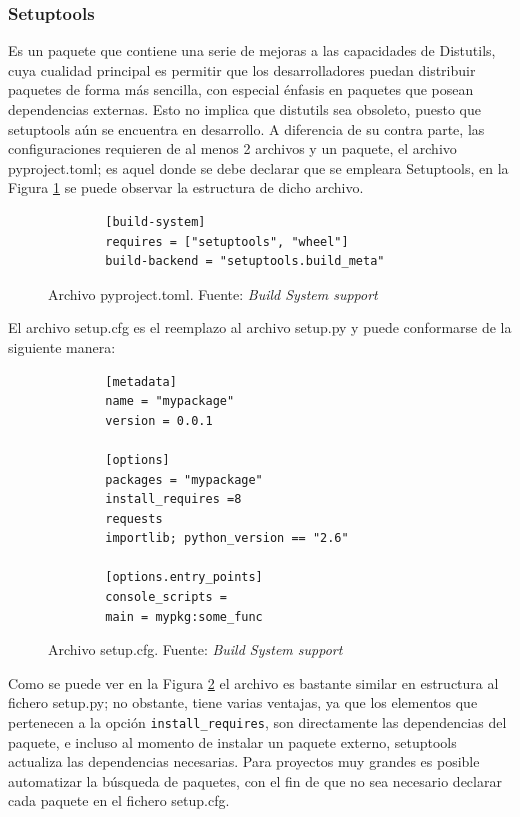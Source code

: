 \subsubsection{Setuptools}
Es un paquete que contiene una serie de mejoras a las capacidades de Distutils, cuya cualidad principal es permitir que los desarrolladores puedan distribuir paquetes de forma más sencilla, con especial énfasis en paquetes que posean dependencias externas. Esto no implica que distutils sea obsoleto, puesto que setuptools aún se encuentra en desarrollo. A diferencia de su contra parte, las configuraciones requieren de al menos 2 archivos y un paquete, el archivo pyproject.toml; es aquel donde se debe declarar que se empleara Setuptools, en la Figura \ref{pyproject.toml} se puede observar la estructura de dicho archivo.
\begin{figure}[H]
    \centering
    \begin{verbatim}
		[build-system]
        requires = ["setuptools", "wheel"]
        build-backend = "setuptools.build_meta"
	\end{verbatim}
    \caption[Archivo pyproject.toml.]{Archivo pyproject.toml. {\footnotesize Fuente: \textit{Build System support} \cite{python-packaging-authority}}}
    \label{pyproject.toml}
\end{figure}
El archivo setup.cfg es el reemplazo al archivo setup.py y puede conformarse de la siguiente manera:
\begin{figure}[H]
    \centering
    \begin{verbatim}
		[metadata]
        name = "mypackage"
        version = 0.0.1

        [options]
        packages = "mypackage"
        install_requires =8
        requests
        importlib; python_version == "2.6"
        
        [options.entry_points]
        console_scripts =
        main = mypkg:some_func
	\end{verbatim}
    \caption[Archivo setup.cfg.]{Archivo setup.cfg. {\footnotesize Fuente: \textit{Build System support} \cite{python-packaging-authority}}}
    \label{setup.cfg}
\end{figure}
Como se puede ver en la Figura \ref{setup.cfg} el archivo es bastante similar en estructura al fichero setup.py; no obstante, tiene varias ventajas, ya que los elementos que pertenecen a la opción \texttt{install_requires}, son directamente las dependencias del paquete, e incluso al momento de instalar un paquete externo, setuptools actualiza las dependencias necesarias. Para proyectos muy grandes es posible automatizar la búsqueda de paquetes, con el fin de que no sea necesario declarar cada paquete en el fichero setup.cfg. 
